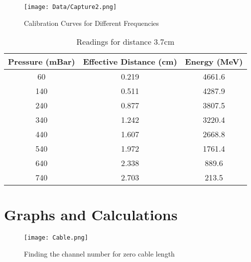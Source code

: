 \documentclass[a4paper]{article}
\begin{document}
\begin{center}
\begin{figure}[H]
	\begin{center}
  \texttt{[image: Data/Capture2.png]}
  \caption{Calibration Curves for Different Frequencies}
  \end{center}
\end{figure}
\end{center}

\begin{table}[H]
\begin{center}
\begin{tabular}{@{}ccc@{}}
\toprule
Pressure (mBar) & Effective Distance (cm) & Energy (MeV) \\ \midrule
60              & 0.219                   & 4661.6       \\
140             & 0.511                   & 4287.9       \\
240             & 0.877                   & 3807.5       \\
340             & 1.242                   & 3220.4       \\
440             & 1.607                   & 2668.8       \\
540             & 1.972                   & 1761.4       \\
640             & 2.338                   & 889.6        \\
740             & 2.703                   & 213.5        \\ \bottomrule
\end{tabular}
\caption{Readings for distance 3.7cm}
\end{center}
\end{table}




\section*{Graphs and Calculations}

\begin{center}
\begin{figure}[H]
	\begin{center}
  \texttt{[image: Cable.png]}
  \caption{Finding the channel number for zero cable length}
  \end{center}
\end{figure}
\end{center}
\end{document}
